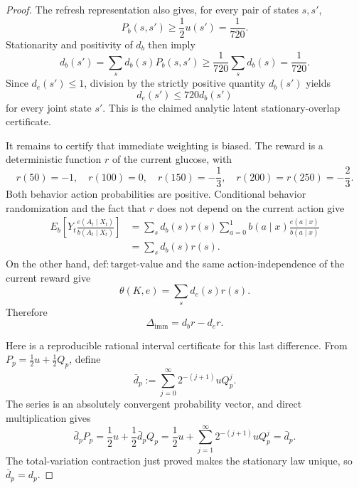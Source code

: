 \documentclass{article}
\begin{document}
\begin{proof}
The refresh representation also gives, for every pair of states
\(s,s'\),
\[
 P_b(s,s')\ge \frac12u(s')=\frac1{720}.
\]
Stationarity and positivity of \(d_b\) then imply
\[
 d_b(s')=\sum_s d_b(s)P_b(s,s')\ge\frac1{720}\sum_s d_b(s)
 =\frac1{720}.
\]
Since \(d_e(s')\le1\), division by the strictly positive quantity
\(d_b(s')\) yields
\[
 d_e(s')\le720d_b(s')
\]
for every joint state \(s'\).  This is the claimed analytic latent
stationary-overlap certificate.

It remains to certify that immediate weighting is biased.  The reward
is a deterministic function \(r\) of the current glucose, with
\[
 r(50)=-1,\quad r(100)=0,\quad r(150)=-\frac13,\quad
 r(200)=r(250)=-\frac23.
\]
Both behavior action probabilities are positive.  Conditional
behavior randomization and the fact that \(r\) does not depend on the
current action give
\[
 \begin{aligned}
 E_b\!\left[Y_t\frac{e(A_t\mid X_t)}{b(A_t\mid X_t)}\right]
 &=\sum_s d_b(s)r(s)\sum_{a=0}^1
       b(a\mid x)\frac{e(a\mid x)}{b(a\mid x)}\\
 &=\sum_s d_b(s)r(s).
 \end{aligned}
\]
On the other hand, \(\mathrm{def{:}target\text{-}value}\) and the same
action-independence of the current reward give
\[
 \theta(K,e)=\sum_s d_e(s)r(s).
\]
Therefore
\[
 \Delta_{\mathrm{imm}}=d_br-d_er.
\]

Here is a reproducible rational interval certificate for this last
difference.  From \(P_p=\tfrac12u+\tfrac12Q_p\), define
\[
 \bar d_p:=\sum_{j=0}^{\infty}2^{-(j+1)}uQ_p^j.
\]
The series is an absolutely convergent probability vector, and direct
multiplication gives
\[
 \bar d_pP_p=\frac12u+\frac12\bar d_pQ_p
 =\frac12u+\sum_{j=1}^{\infty}2^{-(j+1)}uQ_p^j=\bar d_p.
\]
The total-variation contraction just proved makes the stationary law
unique, so \(\bar d_p=d_p\).


\end{proof}
\end{document}
